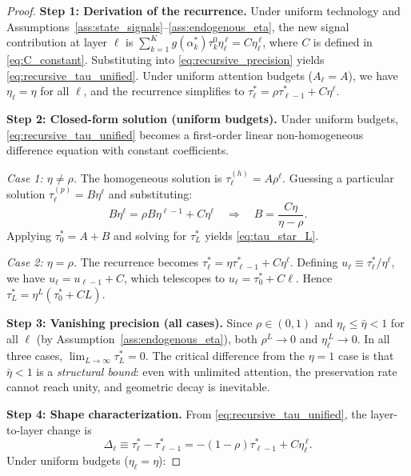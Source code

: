 \begin{proof}
\noindent\textbf{Step 1: Derivation of the recurrence.}
Under uniform technology and Assumptions~\ref{ass:state_signals}--\ref{ass:endogenous_eta}, the new signal contribution at layer $\ell$ is $\sum_{k=1}^{K} g(\alpha^*_k) \tau^0_k \eta_\ell^{\,\ell} = C\eta_\ell^{\,\ell}$, where $C$ is defined in \eqref{eq:C_constant}. Substituting into \eqref{eq:recursive_precision} yields \eqref{eq:recursive_tau_unified}. Under uniform attention budgets ($A_\ell = A$), we have $\eta_\ell = \eta$ for all $\ell$, and the recurrence simplifies to $\tau^{*}_{\ell} = \rho \tau^{*}_{\ell-1} + C\eta^{\ell}$.

\noindent\textbf{Step 2: Closed-form solution (uniform budgets).}
Under uniform budgets, \eqref{eq:recursive_tau_unified} becomes a first-order linear non-homogeneous difference equation with constant coefficients.

\textit{Case 1: $\eta \neq \rho$.} The homogeneous solution is $\tau^{(h)}_{\ell} = A \rho^{\ell}$. Guessing a particular solution $\tau^{(p)}_{\ell} = B \eta^{\ell}$ and substituting:
\begin{equation*}
B\eta^{\ell} = \rho B \eta^{\ell-1} + C\eta^{\ell}
\quad\Longrightarrow\quad
B = \frac{C\eta}{\eta - \rho}.
\end{equation*}
Applying $\tau^{*}_{0} = A + B$ and solving for $\tau^{*}_{L}$ yields \eqref{eq:tau_star_L}.

\textit{Case 2: $\eta = \rho$.} The recurrence becomes $\tau^{*}_{\ell} = \eta \tau^{*}_{\ell-1} + C\eta^{\ell}$. Defining $u_{\ell} \equiv \tau^{*}_{\ell}/\eta^{\ell}$, we have $u_{\ell} = u_{\ell-1} + C$, which telescopes to $u_{\ell} = \tau^{*}_{0} + C\ell$. Hence $\tau^{*}_{L} = \eta^{L}(\tau^{*}_{0} + CL)$.

\noindent\textbf{Step 3: Vanishing precision (all cases).}
Since $\rho \in (0,1)$ and $\eta_\ell \leq \bar{\eta} < 1$ for all $\ell$ (by Assumption~\ref{ass:endogenous_eta}), both $\rho^{L} \to 0$ and $\eta_\ell^{\,L} \to 0$. In all three cases, $\lim_{L\to\infty} \tau^{*}_{L} = 0$. The critical difference from the $\eta = 1$ case is that $\bar{\eta} < 1$ is a \emph{structural bound}: even with unlimited attention, the preservation rate cannot reach unity, and geometric decay is inevitable.

\noindent\textbf{Step 4: Shape characterization.}
From \eqref{eq:recursive_tau_unified}, the layer-to-layer change is
\begin{equation}\label{eq:delta_tau}
\Delta_{\ell} \equiv \tau^{*}_{\ell} - \tau^{*}_{\ell-1} = -(1-\rho)\tau^{*}_{\ell-1} + C\eta_\ell^{\,\ell}.
\end{equation}
Under uniform budgets ($\eta_\ell = \eta$):


\end{proof}
